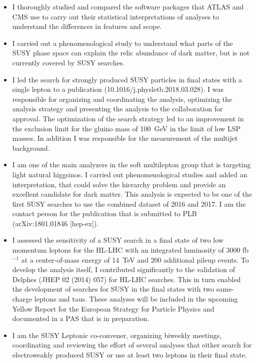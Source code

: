 \documentclass[]{cv} %
\begin{document}
\begin{resume}
\begin{itemize}
  \item I thoroughly studied and compared the software packages that ATLAS and
        CMS use to carry out their statistical interpretations of analyses to
        understand the differences in features and scope.
  \item I carried out a phenomenological study to understand what parts of the
        SUSY phase space can explain the relic abundance of dark matter, but
        is not currently covered by SUSY searches.
  \item I led the search for strongly produced SUSY particles in final states
        with a single lepton to a publication (10.1016/j.physletb.2018.03.028).
        I was responsible for organizing and coordinating the analysis,
        optimizing the analysis strategy and presenting the analysis to the
        collaboration for approval. The optimization of the search strategy led
        to an improvement in the exclusion limit for the gluino mass of 100~GeV
        in the limit of low LSP masses. In addition I was responsible for the
        measurement of the multijet background.
  \item I am one of the main analyzers in the soft multilepton group that is
        targeting light natural higgsinos. I carried out phenomenological studies and
        added an interpretation, that could solve the hierarchy problem and provide an
        excellent candidate for dark matter. This analysis is expected to be one of
        the first SUSY searches to use the combined dataset of 2016 and 2017. I am the
        contact person for the publication that is submitted to PLB (arXiv:1801.01846
        [hep-ex]).
  \item I assessed the sensitivity of a SUSY search in a final state of two low
        momentum leptons for the HL-LHC with an integrated luminosity of 3000
        fb$^{-1}$ at a center-of-mass energy of 14~TeV and 200 additional pileup
        events. To develop the analysis itself, I contributed significantly to
        the validation of Delphes (JHEP 02 (2014) 057) for HL-LHC searches. This
        in turn enabled the development of searches for SUSY in the final states
        with two same-charge leptons and taus. These analyses will be included
        in the upcoming Yellow Report for the European Strategy for Particle
        Physics and documented in a PAS that is in preparation.
  \item I am the SUSY Leptonic co-convener, organizing biweekly meetings,
        coordinating and reviewing the effort of several analyses that either
        search for electroweakly produced SUSY or use at least two leptons in
        their final state.
\end{itemize}


\end{resume}
\end{document}
